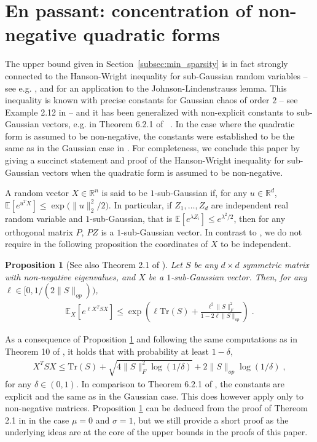 \documentclass{ps}
\def\R{\mathbb{R}}
\newcommand{\E}{\mathbb{E}}
\newcommand{\Tr}{\mathrm{Tr}}
\newcommand{\1}{\mathbbm{1}}
\theoremstyle{plain}
\newtheorem{proposition}{Proposition}
\begin{document}
\section{En passant: concentration of non-negative quadratic forms}\label{sec:HW}
The upper bound given in Section~\ref{subsec:min_sparsity} is in fact strongly connected to the Hanson-Wright inequality for sub-Gaussian random variables -- see e.g. \cite{rudelson2013hanson}, and \cite{simpleJL24} for an application to the Johnson-Lindenstrauss lemma. This inequality is known with precise constants for Gaussian chaos of order $2$ -- see Example 2.12 in \cite{boucheron2013concentration} -- and it has been generalized with non-explicit constants to sub-Gaussian vectors, e.g. in Theorem 6.2.1 of ~\cite{vershynin19HDP}. In the case where the quadratic form is assumed to be non-negative, the constants were established to be the same as in the Gaussian case in \cite{hsu2012tail}. 
For completeness, we conclude this paper by giving a succinct statement and proof of the Hanson-Wright inequality for sub-Gaussian vectors when the quadratic form is assumed to be non-negative. 

A random vector $X \in \R^n$ is said to be $1$-sub-Gaussian if, for any $u\in\R^d$, $\E[e^{u^T X}] \leq \exp\big(\|u\|^2_2/2\big)$.
In particular, if $Z_{1}, \dots, Z_d$ are independent real random variable and $1$-sub-Gaussian, that is $\E[e^{\lambda Z_i}] \leq e^{\lambda^2/2}$, then for any orthogonal matrix $P$, $PZ$ is a $1$-sub-Gaussian vector. In contrast to \cite{rudelson2013hanson}, we do not require in the following proposition the coordinates of $X$ to be independent. 

\begin{proposition}[See also Theorem 2.1 of \cite{hsu2012tail}]\label{prop:right_tail}
	Let $S$ be any $d \times d$ symmetric matrix with non-negative eigenvalues, and $X$ be a $1$-sub-Gaussian vector.
    Then, for any $\ell \in [0,1/(2\|S\|_{op}))$,
    \begin{align*}
        \E_X[e^{\ell X^T S X}] \leq \exp\left(\ell  \Tr(S) + \tfrac{\ell ^2 \|S\|_F^2}{1-2\ell \|S\|_{op}}\right) \; .
    \end{align*}
\end{proposition}
As a consequence of Proposition \ref{prop:right_tail} and following the same computations as in Theorem 10 of \cite{boucheron2013concentration}, it holds that with
probability at least $1- \delta$,
    \begin{align*}
        X^T S X \leq \Tr(S) + \sqrt{4\|S\|_F^2\log(1/\delta)} + 2\|S\|_{op}\log(1/\delta) \; ,
    \end{align*}
for any $\delta \in (0, 1)$. In comparison to Theorem 6.2.1 of \cite{vershynin19HDP}, the constants are explicit and the same as in the Gaussian case. This does however apply only to non-negative matrices.
Proposition \ref{prop:right_tail} can be deduced from the proof of Thereom 2.1 in \cite{hsu2012tail} in the case $\mu=0$ and $\sigma = 1$, but we still provide a short proof as the underlying ideas are at the core of the upper bounds in the proofs of this paper.
\end{document}
